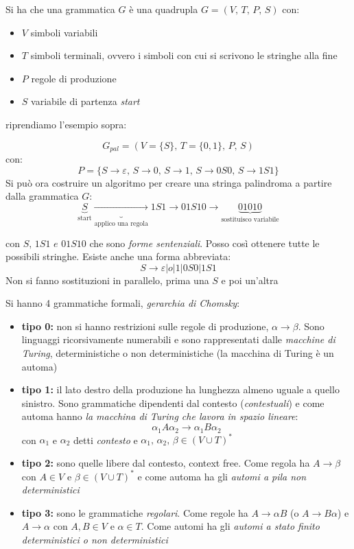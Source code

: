 \documentclass[a4paper,12pt, oneside]{book}
\begin{document}
Si ha che una grammatica $G$ è una quadrupla $G=(V,\,T,\,P,\,S)$ con:
\begin{itemize}
\item $V$ simboli variabili
\item $T$ simboli terminali, ovvero i simboli con cui si scrivono le stringhe alla fine
\item $P$ regole di produzione
\item $S$ variabile di partenza \textit{start}
\end{itemize}
riprendiamo l'esempio sopra:
\begin{esempio}
$$G_{pal}=(V=\{S\},\, T=\{0, 1\},\, P,\, S)$$
con:
$$P=\{S\to\varepsilon,\, S\to 0,\, S\to 1,\, S\to 0S0,\, S\to 1S1\}$$
Si può ora costruire un algoritmo per creare una stringa palindroma a partire dalla grammatica $G$:
$$\underbrace{S}_{\mbox{start}}\underbrace{\to}_{\mbox{applico una regola}} 1S1 \to 01S10\to \underbrace{01010}_{\mbox{sostituisco variabile}}$$

con $S,\, 1S1\,\, e\,\, 01S10$ che sono \textit{forme sentenziali}. Posso così ottenere tutte le possibili stringhe. Esiste anche una forma abbreviata:
$$S\to \varepsilon|o|1|0S0|1S1$$
Non si fanno sostituzioni in parallelo, prima una $S$ e poi un'altra
\end{esempio}
Si hanno 4 grammatiche formali, \textit{gerarchia di Chomsky}:
\begin{itemize}
\item \textbf{tipo 0:} non si hanno restrizioni sulle regole di produzione, $\alpha\to\beta$. Sono linguaggi ricorsivamente numerabili e sono rappresentati dalle \textit{macchine di Turing}, deterministiche o non deterministiche (la macchina di Turing è un automa)
\item \textbf{tipo 1:}  il lato destro della produzione ha lunghezza almeno uguale a quello sinistro. Sono grammatiche dipendenti dal contesto (\textit{contestuali}) e come automa hanno\textit{ la macchina di Turing che lavora in spazio lineare}:
$$\alpha_1A\alpha_2\to \alpha_1B\alpha_2$$
con $\alpha_1$ e $\alpha_2$ detti \textit{contesto} e $\alpha_1,\,\alpha_2,\, \beta\in (V\cup T)^*$
\item \textbf{tipo 2:} sono quelle libere dal contesto, context free. Come regola ha $A\to\beta$ con $A\in V$ e $\beta\in (V\cup T)^*$ e come automa ha gli \textit{automi a pila non deterministici}
\item \textbf{tipo 3:} sono le grammatiche \textit{regolari}. Come regole ha $A\to\alpha B$ (o $A\to B\alpha$) e $A\to\alpha$  con $A,B\in V$ e $\alpha\in T$. Come automi ha gli \textit{automi a stato finito deterministici o non deterministici}
\end{itemize}
\end{document}
